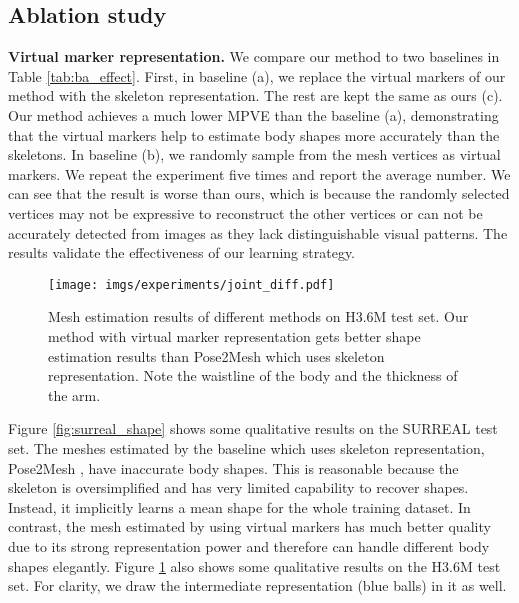 \subsection{Ablation study}
\label{subsec:ablation}
\noindent\textbf{Virtual marker representation.}
\label{subsubsec:ablation_effect}
We compare our method to two baselines in Table \ref{tab:ba_effect}. First, in baseline (a), we replace the virtual markers of our method with the skeleton representation. The rest are kept the same as ours (c). Our method achieves a much lower MPVE than the baseline (a), demonstrating that the virtual markers help to estimate body shapes more accurately than the skeletons. In baseline (b), we randomly sample  from the  mesh vertices as virtual markers. We repeat the experiment five times and report the average number. We can see that the result is worse than ours, which is because the randomly selected vertices may not be expressive to reconstruct the other vertices or can not be accurately detected from images as they lack distinguishable visual patterns. The results validate the effectiveness of our learning strategy. 





\begin{figure}[t]
	\centering
	\texttt{[image: imgs/experiments/joint\_diff.pdf]}
	\caption{Mesh estimation results of different methods on H3.6M test set. Our method with virtual marker representation gets better shape estimation results than Pose2Mesh which uses skeleton representation. Note the waistline of the body and the thickness of the arm.}
	\label{fig:joint_diff}
\vspace{-0.4cm}
\end{figure}




Figure \ref{fig:surreal_shape} shows some qualitative results on the SURREAL test set. The meshes estimated by the baseline which uses skeleton representation, \ie Pose2Mesh \cite{choi2020pose2mesh}, have inaccurate body shapes. This is reasonable because the skeleton is oversimplified and has very limited capability to recover shapes. Instead, it implicitly learns a mean shape for the whole training dataset. In contrast, the mesh estimated by using virtual markers has much better quality due to its strong representation power and therefore can handle different body shapes elegantly. 
Figure \ref{fig:joint_diff} also shows some qualitative results on the H3.6M test set. For clarity, we draw the intermediate representation (blue balls) in it as well.













